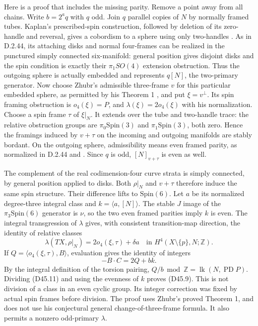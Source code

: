 Here is a proof that includes the missing parity. Remove a
point away from all chains. Write $b=2^a q$ with $q$ odd.
Join $q$ parallel copies of $N$ by normally framed tubes.
Kaplan's prescribed-spin construction, followed by deletion
of its zero-handle and reversal, gives a cobordism to a
sphere using only two-handles
\cite[Definition 1.7, Remark 1.8 and Theorem 3.1]{mapsKaplan79}.
As in D.2.44, its attaching disks and normal four-frames can
be realized in the punctured simply connected six-manifold:
general position gives disjoint disks and the spin condition
is exactly their $\pi_1SO(4)$ extension obstruction.
Thus the outgoing sphere is actually embedded and represents
$q[N]$, the two-primary generator.
Now choose Zhubr's admissible three-frame $v$ for this
particular embedded sphere, as permitted by his Theorem 1
\cite{ffZhubr13}, and put $\xi=v^\perp$. Its spin framing
obstruction is $o_4(\xi)=P$, and
$\lambda(\xi)=2o_4(\xi)$ with his normalization.
Choose a spin frame $\tau$ of $\xi|_N$.
It extends over the tube and two-handle trace: the relative
obstruction groups are $\pi_0\mathrm{Spin}(3)$ and
$\pi_1\mathrm{Spin}(3)$, both zero. Hence the framings
induced by $v+\tau$ on the incoming and outgoing manifolds
are stably bordant. On the outgoing sphere, admissibility
means even framed parity, as normalized in D.2.44 and
\cite[Section 5]{ffZhubr13}. Since $q$ is odd,
$[N]_{v+\tau}$ is even as well.

The complement of the real codimension-four curve strata
is simply connected, by general position applied to disks.
Both $\rho|_N$ and $v+\tau$ therefore induce the same spin
structure. Their difference lifts to $\mathrm{Spin}(6)$.
Let $a$ be its normalized degree-three integral class and
$k=\langle a,[N]\rangle$. The stable $J$ image of the
$\pi_3\mathrm{Spin}(6)$ generator is $\nu$, so the two
even framed parities imply $k$ is even. The integral
transgression of $\lambda$ gives, with consistent
transition-map direction, the identity of relative classes
\[
 \lambda(TX,\rho|_N)=2o_4(\xi,\tau)+\delta a
                         \quad\text{in }H^4(X\setminus\{p\},N;\mathbb Z).
                                                               \tag{D45.10}
\]
If $Q=\langle o_4(\xi,\tau),B\rangle$, evaluation gives
the identity of integers
\[
                       -B\cdot C=2Q+bk.                    \tag{D45.11}
\]
By the integral definition of the torsion pairing,
$Q/b\bmod\mathbb Z=\operatorname{lk}(N,\operatorname{PD}P)$.
Dividing (D45.11) and using the evenness of $k$ proves
(D45.9). This is not division of a class in an even cyclic
group. Its integer correction was fixed by actual spin
frames before division. The proof uses Zhubr's proved
Theorem 1, and does not use his conjectural general
change-of-three-frame formula. It also permits a nonzero
odd-primary $\lambda$.


